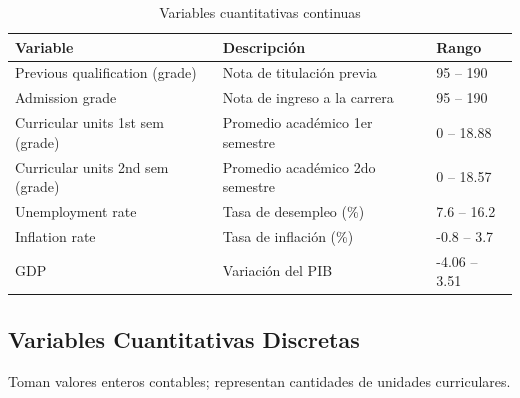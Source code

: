 \documentclass[11pt,a4paper]{article}
\begin{document}
\begin{table}[H]
  \centering
  \begin{tabular}{p{7cm} p{4.5cm} p{2.5cm}}
    \toprule
    \textbf{Variable} & \textbf{Descripción} & \textbf{Rango} \\
    \midrule
    Previous qualification (grade) & Nota de titulación previa       & 95 -- 190 \\
    Admission grade                 & Nota de ingreso a la carrera    & 95 -- 190 \\
    Curricular units 1st sem (grade)& Promedio académico 1er semestre & 0 -- 18.88 \\
    Curricular units 2nd sem (grade)& Promedio académico 2do semestre & 0 -- 18.57 \\
    Unemployment rate               & Tasa de desempleo (\%)          & 7.6 -- 16.2 \\
    Inflation rate                  & Tasa de inflación (\%)          & -0.8 -- 3.7 \\
    GDP                             & Variación del PIB               & -4.06 -- 3.51 \\
    \bottomrule
  \end{tabular}
  \caption{Variables cuantitativas continuas}
\end{table}

\subsection{Variables Cuantitativas Discretas}

Toman valores enteros contables; representan cantidades de unidades curriculares.
\end{document}
